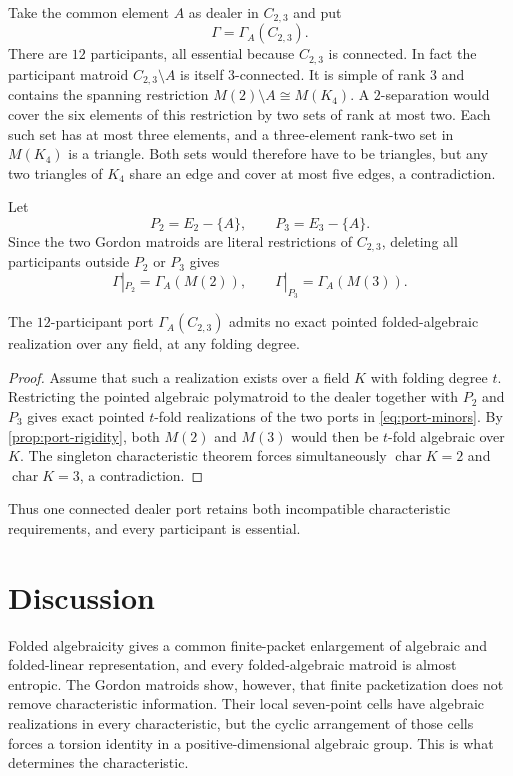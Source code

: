 \documentclass[11pt]{article}
\theoremstyle{definition}
\begin{document}
Take the common element $A$ as dealer in $C_{2,3}$ and put
\[
\Gamma=\Gamma_A(C_{2,3}).
\]
There are $12$ participants, all essential because $C_{2,3}$ is connected.  In fact the participant matroid $C_{2,3}\setminus A$ is itself $3$-connected.  It is simple of rank $3$ and contains the spanning restriction $M(2)\setminus A\cong M(K_4)$.  A $2$-separation would cover the six elements of this restriction by two sets of rank at most two.  Each such set has at most three elements, and a three-element rank-two set in $M(K_4)$ is a triangle.  Both sets would therefore have to be triangles, but any two triangles of $K_4$ share an edge and cover at most five edges, a contradiction.

Let
\[
P_2=E_2-\{A\},\qquad P_3=E_3-\{A\}.
\]
Since the two Gordon matroids are literal restrictions of $C_{2,3}$, deleting all participants outside $P_2$ or $P_3$ gives
\begin{equation}\label{eq:port-minors}
\Gamma|_{P_2}=\Gamma_A(M(2)),
\qquad
\Gamma|_{P_3}=\Gamma_A(M(3)).
\end{equation}

\begin{corollary}\label{cor:dealer}
The $12$-participant port $\Gamma_A(C_{2,3})$ admits no exact pointed folded-algebraic realization over any field, at any folding degree.
\end{corollary}
\begin{proof}
Assume that such a realization exists over a field $K$ with folding degree $t$.  Restricting the pointed algebraic polymatroid to the dealer together with $P_2$ and $P_3$ gives exact pointed $t$-fold realizations of the two ports in \eqref{eq:port-minors}.  By \cref{prop:port-rigidity}, both $M(2)$ and $M(3)$ would then be $t$-fold algebraic over $K$.  The singleton characteristic theorem forces simultaneously $\operatorname{char}K=2$ and $\operatorname{char}K=3$, a contradiction.
\end{proof}

Thus one connected dealer port retains both incompatible characteristic requirements, and every participant is essential.

\section{Discussion}\label{sec:discussion}

Folded algebraicity gives a common finite-packet enlargement of algebraic and folded-linear representation, and every folded-algebraic matroid is almost entropic.  The Gordon matroids show, however, that finite packetization does not remove characteristic information.  Their local seven-point cells have algebraic realizations in every characteristic, but the cyclic arrangement of those cells forces a torsion identity in a positive-dimensional algebraic group.  This is what determines the characteristic.
\end{document}
